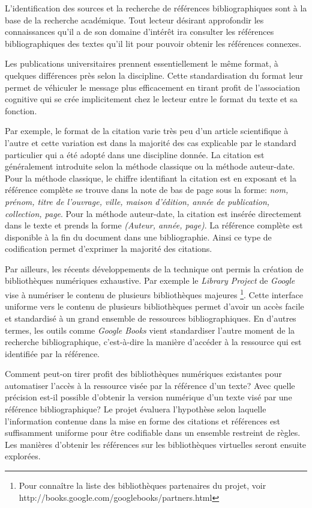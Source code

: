 L'identification des sources et la recherche de références bibliographiques sont à la base de la recherche académique. Tout lecteur désirant approfondir les connaissances qu'il a de son domaine d'intérêt ira consulter les références bibliographiques des textes qu'il lit pour pouvoir obtenir les références connexes.

Les publications universitaires prennent essentiellement le même format, à quelques différences près selon la discipline. Cette standardisation du format leur permet de véhiculer le message plus efficacement en tirant profit de l'association cognitive qui se crée implicitement chez le lecteur entre le format du texte et sa fonction. 

Par exemple, le format de la citation varie très peu d'un article scientifique à l'autre et cette variation est dans la majorité des cas explicable par le standard particulier qui a été adopté dans une discipline donnée. La citation est généralement introduite selon la méthode classique ou la méthode auteur-date. Pour la méthode classique, le chiffre identifiant la citation est en exposant et la référence complète se trouve dans la note de bas de page sous la forme: \emph{nom, prénom, titre de l'ouvrage, ville, maison d'édition, année de publication, collection, page}. Pour la méthode auteur-date, la citation est insérée directement dans le texte et prends la forme \emph{(Auteur, année, page)}. La référence complète est disponible à la fin du document dans une bibliographie. Ainsi ce type de codification permet d'exprimer la majorité des citations.

Par ailleurs, les récents développements de la technique ont permis la création de bibliothèques numériques exhaustive. Par exemple le \emph{Library Project} de \emph{Google} vise à numériser le contenu de plusieurs bibliothèques majeures \footnote{Pour connaître la liste des bibliothèques partenaires du projet, voir http://books.google.com/googlebooks/partners.html}. Cette interface uniforme vers le contenu de plusieurs bibliothèques permet d'avoir un accès facile et standardisé à un grand ensemble de ressources bibliographiques. En d'autres termes, les outils comme \emph{Google Books} vient standardiser l'autre moment de la recherche bibliographique, c'est-à-dire la manière d'accéder à la ressource qui est identifiée par la référence.

Comment peut-on tirer profit des bibliothèques numériques existantes pour automatiser l'accès à la ressource visée par la référence d'un texte? Avec quelle précision est-il possible d'obtenir la version numérique d'un texte visé par une référence bibliographique? Le projet évaluera l'hypothèse selon laquelle l'information contenue dans la mise en forme des citations et références est suffisamment uniforme pour être codifiable dans un ensemble restreint de règles. Les manières d'obtenir les références sur les bibliothèques virtuelles seront ensuite explorées.

